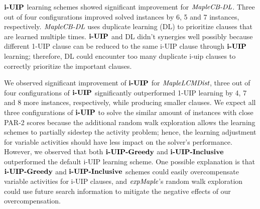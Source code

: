 $\textbf{i-UIP}$ learning schemes showed significant improvement for $\textit{MapleCB-DL}$. Three out of four configurations improved solved instances by 6, 5 and 7 instances, respectively. $\textit{MapleCB-DL}$ uses duplicate learning (DL) to prioritize clauses that are learned multiple times. $\textbf{i-UIP}$ and DL didn't synergies well possibly because different 1-UIP clause can be reduced to the same i-UIP clause through $\textbf{i-UIP}$ learning; therefore, DL could encounter too many duplicate i-uip clauses to correctly prioritize the important clauses. 

We observed significant improvement of $\textbf{i-UIP}$ for $\textit{MapleLCMDist}$, three out of four configurations of $\textbf{i-UIP}$ significantly outperformed 1-UIP learning by 4, 7 and 8 more instances, respectively, while producing smaller clauses. We expect all three configurations of $\textbf{i-UIP}$ to solve the similar amount of instances with close PAR-2 scores because the additional random walk exploration allows the learning schemes to partially sidestep the activity problem; hence, the learning adjustment for variable activities should have less impact on the solver's performance. However, we observed that both $\textbf{i-UIP-Greedy}$ and $\textbf{i-UIP-Inclusive}$ outperformed the default i-UIP learning scheme. One possible explanation is that $\textbf{i-UIP-Greedy}$ and $\textbf{i-UIP-Inclusive}$ schemes could easily overcompensate variable activities for i-UIP clauses, and $\textit{expMaple}$'s random walk exploration could use future search information to mitigate the negative effects of our overcompensation. 


